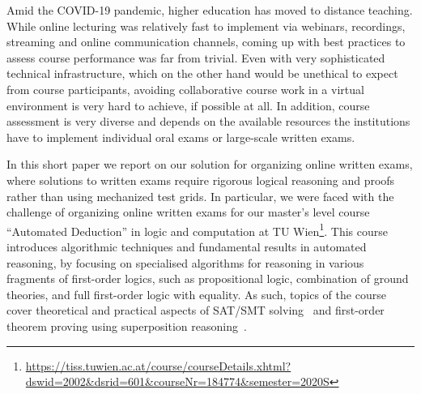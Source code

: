 Amid the COVID-19 pandemic, higher education has moved to distance
teaching. While online lecturing was relatively fast to implement via
webinars, recordings,  streaming and online communication channels,
coming up with best practices to assess course performance was far
from trivial. Even with very sophisticated technical infrastructure,
which on the other hand would be unethical to expect from course
participants,  avoiding collaborative course work in a virtual
environment is very hard to achieve, if possible at all.
In addition, course assessment is very diverse and depends on the
available resources the  institutions have to implement individual oral
exams or large-scale written exams.

In this short paper we report on our solution for organizing online
written exams, where solutions to written exams require rigorous
logical reasoning and proofs rather than using mechanized test grids.
In particular, we were faced with the challenge of organizing online
written exams for our master's level course ``Automated
Deduction'' in logic and computation at TU
Wien\footnote{\url{https://tiss.tuwien.ac.at/course/courseDetails.xhtml?dswid=2002\&dsrid=601\&courseNr=184774\&semester=2020S}}.
This course introduces algorithmic techniques and fundamental results
in automated reasoning, by focusing on specialised algorithms for
reasoning in various fragments of first-order logics, such as
propositional logic, combination of ground theories, and full
first-order logic with equality.
As such, topics of the course cover theoretical and practical
aspects of SAT/SMT solving~\cite{DPLL,Tinelli02,DPLLT} and first-order theorem proving using
superposition reasoning~\cite{Ganzinger01,Rubio01,Vampire13}.

